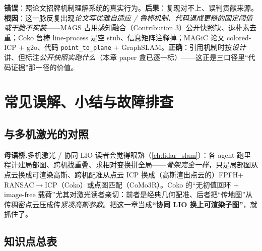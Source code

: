 \begin{pitfall}
\textbf{错误}：照论文招牌机制理解系统的真实行为。\textbf{后果}：复现对不上、误判贡献来源。\textbf{根因}：这一脉反复出现\emph{论文写优雅自适应 / 鲁棒机制、代码退成更糙的固定阈值或干脆不实装}——MAGS 占用感知融合（Contribution 3）公开快照缺、退朴素去重；Coko 鲁棒 line-process 是空 stub、信息矩阵注释掉；MAGiC 论文 colored-ICP $+$ g2o、代码 \texttt{point\_to\_plane} $+$ GraphSLAM。\textbf{正确}：引用机制时按\emph{设计}讲、但标注\emph{公开快照实跑什么}（本章 paper 盒已逐一标）——这正是三口径里“代码证据”那一径的价值。
\end{pitfall}

\section{常见误解、小结与故障排查}
\label{sec:mags-summary}

\subsection{与多机激光的对照}

\begin{note}
\textbf{母语桥.}\;多机激光 / 协同 LIO 读者会觉得眼熟（\cref{ch:lidar_slam}）：各 agent 跑里程计建局部图、跨机找重叠、求相对变换拼全局——\emph{骨架完全一样}，只是局部图从点云换成可渲染高斯、跨机配准从点云 ICP 换成（高斯渲出点云的）FPFH$+$RANSAC$\to$ICP（Coko）或点图匹配（CoMo3R）。Coko 的“无初值回环 $+$ image-free 载荷”尤其对激光读者亲切：前者是经典几何配准、后者把“传地图”从传稠密点云压成传\emph{紧凑高斯参数}。把这一章当成\textbf{“协同 LIO 换上可渲染子图”}，就抓住了。
\end{note}

\subsection{知识点总表}

